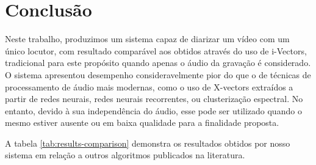 \chapter{Conclusão}

Neste trabalho, produzimos um sistema capaz de diarizar um vídeo com um único locutor, com resultado comparável aos obtidos através do uso de i-Vectors, tradicional para este propósito quando apenas o áudio da gravação é considerado.
O sistema apresentou desempenho consideravelmente pior do que o de técnicas de processamento de áudio mais modernas, como o uso de X-vectors extraídos a partir de redes neurais, redes neurais recorrentes, ou clusterização espectral.
No entanto, devido à sua independência do áudio, esse pode ser utilizado quando o mesmo estiver ausente ou em baixa qualidade para a finalidade proposta.

A tabela \ref{tab:results-comparison} demonstra os resultados obtidos por nosso sistema em relação a outros algoritmos publicados na literatura.

